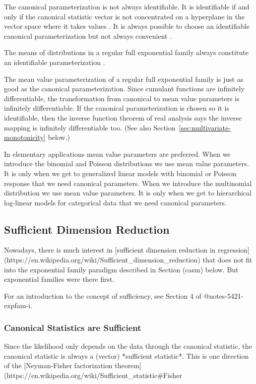 \documentclass[11pt]{article}
\begin{document}
The canonical parameterization is not always identifiable.
It is identifiable if and only if the canonical statistic vector
is not concentrated
on a hyperplane in the vector space where it takes values
\citep[Theorem~1]{geyer-gdor}.
It is always possible to choose an identifiable canonical parameterization
but not always convenient \citep{geyer-gdor}.

The means of distributions in a regular full exponential family
always constitute an identifiable parameterization
\citep[Theorem~2]{notes-5421-expfam-i}.

The mean value parameterization of a regular full exponential family is
just as good as the canonical parameterization.  Since cumulant functions
are infinitely differentiable, the transformation from canonical to mean
value parameters is infinitely differentiable.  If the canonical
parameterization is chosen so it is identifiable, then the inverse function
theorem of real analysis says the inverse mapping is infinitely
differentiable too.
(See also Section~\ref{sec:multivariate-monotonicity} below.)

In elementary applications mean value parameters are preferred.
When we introduce the binomial and Poisson distributions we use mean
value parameters.  It is only when we get to generalized linear models
with binomial or Poisson response that we need canonical parameters.
When we introduce the multinomial distribution we use mean value parameters.
It is only when we get to hierarchical log-linear models for categorical
data that we need canonical parameters.

\subsection{Sufficient Dimension Reduction}

Nowadays, there is much interest in [sufficient dimension reduction
in regression](https://en.wikipedia.org/wiki/Sufficient_dimension_reduction)
that does not fit into the exponential family paradigm described in
Section \@ref(casm) below.  But exponential families were there first.

For an introduction to the concept of sufficiency, see Section 4 of
@notes-5421-expfam-i.

\subsubsection{Canonical Statistics are Sufficient}

Since the likelihood only depends on the data through the canonical statistic,
the canonical statistic is always a (vector) *sufficient statistic*.
This is one direction of the [Neyman-Fisher factorization theorem](https://en.wikipedia.org/wiki/Sufficient_statistic#Fisher%
\end{document}
